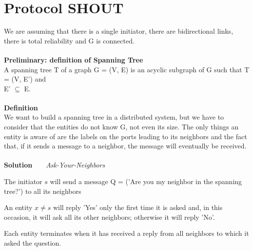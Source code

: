 \documentclass[paper=a4, fontsize=11pt]{scrartcl} %
\numberwithin{equation}{section} %
\numberwithin{figure}{section} %
\numberwithin{table}{section} %
\begin{document}
\section*{Protocol SHOUT}
We are assuming that there is a single initiator, there are bidirectional links, there is total reliability and G is connected. \\ \\
\textbf{Preliminary: definition of Spanning Tree} \\ 
A spanning tree T of a graph G = (V, E) is an acyclic subgraph of G such that T = (V, E') and\\ E' $\subseteq$ E.
\\ ~ \\
\textbf{Definition} \\
We want to build a spanning tree in a distributed system, but we have to consider that the entities do not know G, not even its size. The only things an entity is aware of are the labels on the ports leading to its neighbors and the fact that, if it sends a message to a neighbor, the message will eventually be received.\\~\\
\textbf{Solution} ~ ~ \textit{Ask-Your-Neighbors}
\begin{compactitem}
\item The initiator $s$ will send a message Q = ('Are you my neighbor in the spanning tree?') to all its neighbors
\item An entity $x \neq s$ will reply 'Yes' only the first time it is asked and, in this occasion, it will ask all its other neighbors; otherwise it will reply 'No'.
\item Each entity terminates when it has received a reply from all neighbors to which it asked the question.
\end{compactitem}
\end{document}
